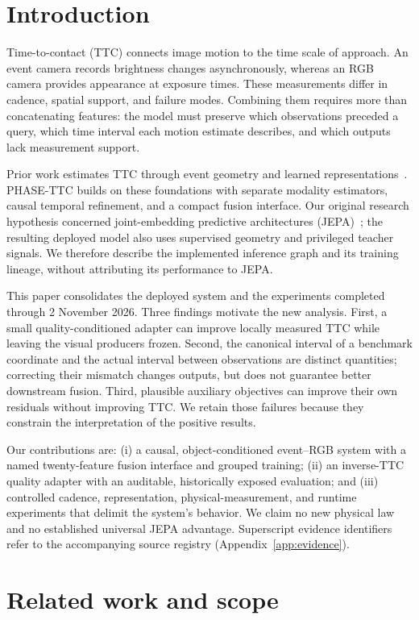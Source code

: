 \documentclass[twocolumn,letterpaper]{article}
\begin{document}
\section{Introduction}
Time-to-contact (TTC) connects image motion to the time scale of approach. An event camera records brightness changes asynchronously, whereas an RGB camera provides appearance at exposure times. These measurements differ in cadence, spatial support, and failure modes. Combining them requires more than concatenating features: the model must preserve which observations preceded a query, which time interval each motion estimate describes, and which outputs lack measurement support.

Prior work estimates TTC through event geometry and learned representations~\citep{eventaided,evttc,eap}. PHASE-TTC builds on these foundations with separate modality estimators, causal temporal refinement, and a compact fusion interface. Our original research hypothesis concerned joint-embedding predictive architectures (JEPA)~\citep{ijepa}; the resulting deployed model also uses supervised geometry and privileged teacher signals. We therefore describe the implemented inference graph and its training lineage, without attributing its performance to JEPA.

This paper consolidates the deployed system and the experiments completed through 2 November 2026. Three findings motivate the new analysis. First, a small quality-conditioned adapter can improve locally measured TTC while leaving the visual producers frozen. Second, the canonical interval of a benchmark coordinate and the actual interval between observations are distinct quantities; correcting their mismatch changes outputs, but does not guarantee better downstream fusion. Third, plausible auxiliary objectives can improve their own residuals without improving TTC. We retain those failures because they constrain the interpretation of the positive results.

Our contributions are: (i) a causal, object-conditioned event--RGB system with a named twenty-feature fusion interface and grouped training; (ii) an inverse-TTC quality adapter with an auditable, historically exposed evaluation; and (iii) controlled cadence, representation, physical-measurement, and runtime experiments that delimit the system's behavior. We claim no new physical law and no established universal JEPA advantage. Superscript evidence identifiers refer to the accompanying source registry (Appendix~\ref{app:evidence}).

\section{Related work and scope}
\end{document}
